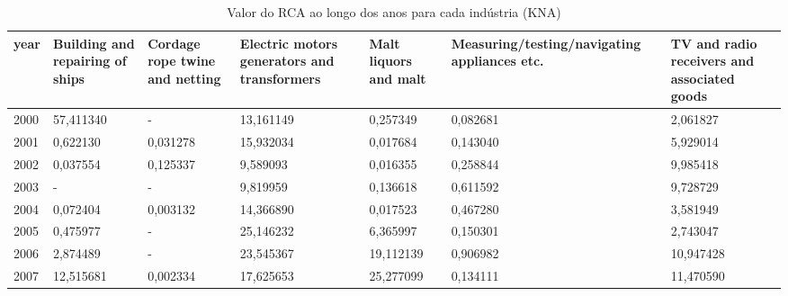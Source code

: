 \begin{table}
\centering
\caption{Valor do RCA ao longo dos anos para cada indústria (KNA)}
\begin{tabular}{p{1cm}p{2cm}p{2cm}p{2cm}p{2cm}p{2cm}p{2cm}}
\toprule
 year &  Building and repairing of ships &  Cordage rope twine and netting &  Electric motors generators and transformers &  Malt liquors and malt &  Measuring/testing/navigating appliances etc. &  TV and radio receivers and associated goods \\
\midrule
 2000 &                        57,411340 &                               - &                                    13,161149 &               0,257349 &                                      0,082681 &                                     2,061827 \\
 2001 &                         0,622130 &                        0,031278 &                                    15,932034 &               0,017684 &                                      0,143040 &                                     5,929014 \\
 2002 &                         0,037554 &                        0,125337 &                                     9,589093 &               0,016355 &                                      0,258844 &                                     9,985418 \\
 2003 &                                - &                               - &                                     9,819959 &               0,136618 &                                      0,611592 &                                     9,728729 \\
 2004 &                         0,072404 &                        0,003132 &                                    14,366890 &               0,017523 &                                      0,467280 &                                     3,581949 \\
 2005 &                         0,475977 &                               - &                                    25,146232 &               6,365997 &                                      0,150301 &                                     2,743047 \\
 2006 &                         2,874489 &                               - &                                    23,545367 &              19,112139 &                                      0,906982 &                                    10,947428 \\
 2007 &                        12,515681 &                        0,002334 &                                    17,625653 &              25,277099 &                                      0,134111 &                                    11,470590 \\

\end{tabular}
\end{table}
